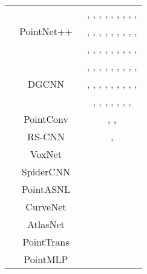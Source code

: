 \documentclass{ieeeaccess}
\begin{document}
\begin{table*}
\begin{center}
\begin{tabular}{ c|c|c}
& \multirow{3}{*}{PointNet++~\cite{qi2017pointnet1}} & \cite{liu2019extending}, \cite{yang2019adversarial}, \cite{liu2022imperceptible}, \cite{kim2021minimal}, \cite{liu2020adversarial}, \cite{arya2021adversarial}, \cite{tsai2020robust}, \cite{zhou2020lg}, \cite{wen2020geometry}, \cite{hamdi2020advpc}\\ && \cite{zheng2019pointcloud}, \cite{xiang2019generating}, \cite{wu2020if}, \cite{huang2022shape}, \cite{tang2022rethinking}, \cite{liang2022pagn}, \cite{liu2022boosting}, \cite{sun2021local}, \cite{dai2021generating}, \cite{zhang20233d}\\ && \cite{lee2020shapeadv}, \cite{dong2020self}, \cite{zhao2020isometry}, \cite{ma2020efficient}, \cite{zhou2019dup}, \cite{cheng2021universal}, \cite{miao2022isometric}, \cite{liu2022point}, \cite{Shi2022Shape}, \cite{he2023point}\\
\cline{2-3}
& \multirow{3}{*}{DGCNN~\cite{phan2018dgcnn}} & \cite{yang2019adversarial}, \cite{liu2022imperceptible}, \cite{kim2021minimal}, \cite{liu2020adversarial}, \cite{arya2021adversarial}, \cite{zhou2020lg}, \cite{wen2020geometry}, \cite{hamdi2020advpc}, \cite{zheng2019pointcloud}, \cite{xiang2019generating}\\ && \cite{wu2020if}, \cite{huang2022shape}, \cite{tang2022rethinking}, \cite{liang2022pagn}, \cite{liu2022boosting}, \cite{liu2021pointguard}, \cite{sun2021improving}, \cite{dai2021generating}, \cite{zhang20233d}, \cite{lee2020shapeadv}\\ && \cite{zhao2020nudge}, \cite{zhao2020isometry}, \cite{ma2020efficient}, \cite{ma2021towards}, \cite{miao2022isometric}, \cite{liu2022point}, \cite{Shi2022Shape}, \cite{he2023point}\\
\cline{2-3}
&PointConv~\cite{wu2019pointconv} & \cite{wu2020if}, \cite{tang2022rethinking}, \cite{liu2022boosting}\\
\cline{2-3}
&RS-CNN~\cite{liu2019relation} & \cite{wu2020if}, \cite{he2023point}\\
\cline{2-3}
&VoxNet~\cite{maturana2015voxnet} & \cite{wicker2019robustness}   \\
\cline{2-3}
&SpiderCNN~\cite{xu2018spidercnn} & \cite{kim2021minimal}\\
\cline{2-3}
&PointASNL~\cite{yan2020pointasnl} & \cite{kim2021minimal}\\
\cline{2-3}
&CurveNet~\cite{xiang2021walk} & \cite{huang2022shape}\\
\cline{2-3}
&AtlasNet~\cite{groueix2018papier} & \cite{lang2021geometric}\\
\cline{2-3}
&PointTrans~\cite{zhao2021point} & \cite{liu2022point}\\
\cline{2-3}
&PointMLP~\cite{ma2022rethinking} & \cite{liu2022point}\\

\hline

\end{tabular}
\end{center}
\end{table*}
\end{document}
